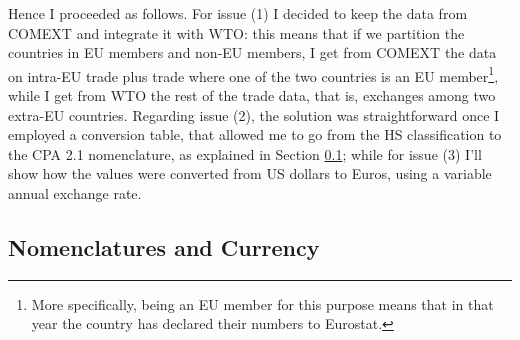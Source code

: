 Hence I proceeded as follows. For issue (1) I decided to keep the data from COMEXT and integrate it with WTO: this means that if we partition the countries in EU members and non-EU members, I get from COMEXT the data on intra-EU trade plus trade where one of the two countries is an EU member\footnote{More specifically, being an EU member for this purpose means that in that year the country has declared their numbers to Eurostat.}, while I get from WTO the rest of the trade data, that is, exchanges among two extra-EU countries.
Regarding issue (2), the solution was straightforward once I employed a conversion table, that allowed me to go from the HS classification to the CPA 2.1 nomenclature, as explained in Section \ref{sec:nomandusd}; while for issue (3) I'll show how the values were converted from US dollars to Euros, using a variable annual exchange rate.


\subsection{Nomenclatures and Currency}\label{sec:nomandusd}


